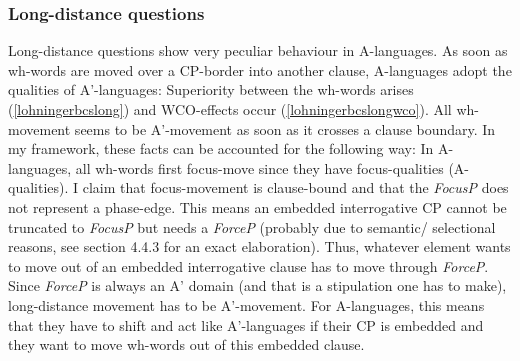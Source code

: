 \documentclass[output=paper,colorlinks,citecolor=brown]{langscibook}
\begin{document}
\subsubsection{Long-distance questions} Long-distance questions show very peculiar behaviour in A-languages. As soon as wh-words are moved over a CP-border into another clause, A-languages adopt the qualities of A'-languages: Superiority between the wh-words arises (\ref{lohningerbcslong}) and WCO-effects occur (\ref{lohningerbcslongwco}). 
\ea 
  \z
\z 
All wh-movement seems to be A'-movement as soon as it crosses a clause boundary. In my framework, these facts can be accounted for the following way: In A-languages, all wh-words first focus-move since they have focus-qualities (A-qualities). I claim that focus-movement is clause-bound and that the \emph{FocusP} does not represent a phase-edge. This means an embedded interrogative CP cannot be truncated to \emph{FocusP} but needs a \emph{ForceP} (probably due to semantic/ selectional reasons, see section 4.4.3 for an exact elaboration). Thus, whatever element wants to move out of an embedded interrogative clause has to move through \emph{ForceP}. Since \emph{ForceP} is always an A' domain (and that is a stipulation one has to make), long-distance movement has to be A'-movement. For A-languages, this means that they have to shift and act like A'-languages if their CP is embedded and they want to move wh-words out of this embedded clause. 
\end{document}
